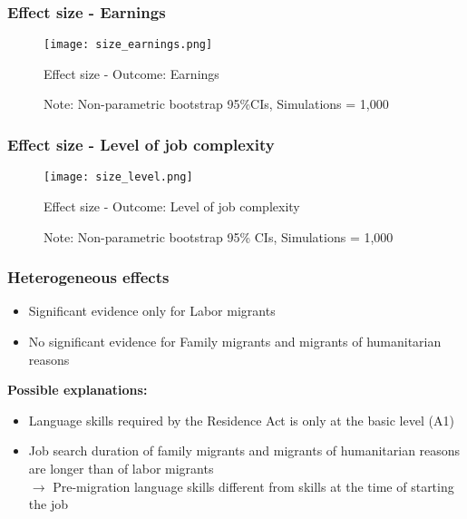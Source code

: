 \documentclass{beamer}
\begin{document}
\begin{frame}
\frametitle{Effect size - Earnings}
\begin{figure}
\centering
\texttt{[image: size\_earnings.png]}
  \caption{Effect size - Outcome: Earnings}
\caption*{Note: Non-parametric bootstrap 95\%CIs, Simulations = 1,000}
\end{figure}
\end{frame}


\begin{frame}
\frametitle{Effect size - Level of job complexity}

\begin{figure}
\centering
\texttt{[image: size\_level.png]}
  \caption{Effect size - Outcome: Level of job complexity}
\caption*{\small{Note: Non-parametric bootstrap 95\% CIs, Simulations = 1,000}}
\end{figure}
\end{frame}

\begin{frame}
\frametitle{Heterogeneous effects}

\begin{table}[htbp]
  \centering
{}
\end{table}%


\begin{itemize}
\item Significant evidence only for Labor migrants
\item No significant evidence for Family migrants and migrants of humanitarian reasons
\end{itemize}

\textbf{Possible explanations:}
\begin{itemize}
\item Language skills required by the Residence Act is only at the basic level (A1)
\item Job search duration of family migrants and migrants of humanitarian reasons are longer than of labor migrants \\ $\rightarrow$ Pre-migration language skills different from skills at the time of starting the job
\end{itemize}

\end{frame}
\end{document}
